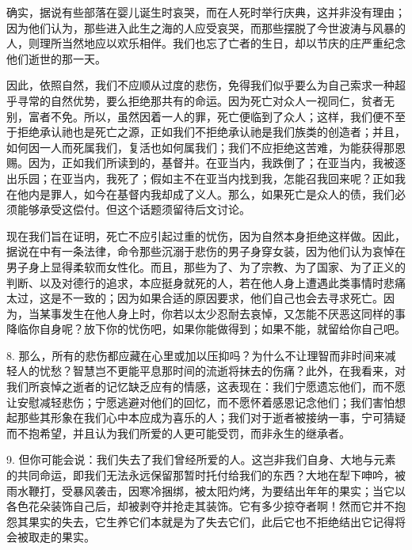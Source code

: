 确实，据说有些部落在婴儿诞生时哀哭，而在人死时举行庆典，这并非没有理由；因为他们认为，那些进入此生之海的人应受哀哭，而那些摆脱了今世波涛与风暴的人，则理所当然地应以欢乐相伴。我们也忘了亡者的生日，却以节庆的庄严重纪念他们逝世的那一天。\par

因此，依照自然，我们不应顺从过度的悲伤，免得我们似乎要么为自己索求一种超乎寻常的自然优势，要么拒绝那共有的命运。因为死亡对众人一视同仁，贫者无别，富者不免。所以，虽然因着一人的罪，死亡便临到了众人；这样，我们便不至于拒绝承认祂也是死亡之源，正如我们不拒绝承认祂是我们族类的创造者；并且，如何因一人而死属我们，复活也如何属我们；我们不应拒绝这苦难，为能获得那恩赐。因为，正如我们所读到的，基督并。在亚当内，我跌倒了；在亚当内，我被逐出乐园；在亚当内，我死了；假如主不在亚当内找到我，怎能召我回来呢？正如我在他内是罪人，如今在基督内我却成了义人。那么，如果死亡是众人的债，我们必须能够承受这偿付。但这个话题须留待后文讨论。\par

现在我们旨在证明，死亡不应引起过重的忧伤，因为自然本身拒绝这样做。因此，据说在中有一条法律，命令那些沉溺于悲伤的男子身穿女装，因为他们认为哀悼在男子身上显得柔软而女性化。而且，那些为了、为了宗教、为了国家、为了正义的判断、以及对德行的追求，本应挺身就死的人，若在他人身上遭遇此类事情时悲痛太过，这是不一致的；因为如果合适的原因要求，他们自己也会去寻求死亡。因为，当某事发生在他人身上时，你若以太少忍耐去哀悼，又怎能不厌恶这同样的事降临你自身呢？放下你的忧伤吧，如果你能做得到；如果不能，就留给你自己吧。\par

8. 那么，所有的悲伤都应藏在心里或加以压抑吗？为什么不让理智而非时间来减轻人的忧愁？智慧岂不更能平息那时间的流逝将抹去的伤痛？此外，在我看来，对我们所哀悼之逝者的记忆缺乏应有的情感，这表现在：我们宁愿遗忘他们，而不愿让安慰减轻悲伤；宁愿逃避对他们的回忆，而不愿怀着感恩记念他们；我们害怕想起那些其形象在我们心中本应成为喜乐的人；我们对于逝者被接纳一事，宁可猜疑而不抱希望，并且认为我们所爱的人更可能受罚，而非永生的继承者。\par

9. 但你可能会说：我们失去了我们曾经所爱的人。这岂非我们自身、大地与元素的共同命运，即我们无法永远保留那暂时托付给我们的东西？大地在犁下呻吟，被雨水鞭打，受暴风袭击，因寒冷捆绑，被太阳灼烤，为要结出年年的果实；当它以各色花朵装饰自己后，却被剥夺并抢走其装饰。它有多少掠夺者啊！然而它并不抱怨其果实的失去，它生养它们本就是为了失去它们，此后它也不拒绝结出它记得将会被取走的果实。\par

